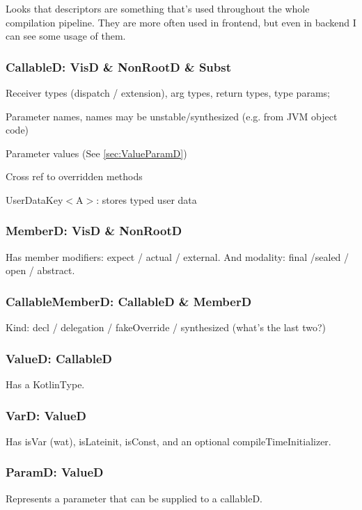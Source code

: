 \documentclass{article}
\begin{document}
Looks that descriptors are something that's used throughout the whole compilation pipeline. They are more often used in frontend, but even in backend I can see some usage of them.

\subsubsection{CallableD: VisD \& NonRootD \& Subst}

Receiver types (dispatch / extension), arg types, return types, type params;

Parameter names, names may be unstable/synthesized (e.g. from JVM object code)

Parameter values (See \ref{sec:ValueParamD})

Cross ref to overridden methods

UserDataKey$<$A$>$: stores typed user data

\subsubsection{MemberD: VisD \& NonRootD}

Has member modifiers: expect / actual / external. And modality: final /sealed / open / abstract.

\subsubsection{CallableMemberD: CallableD \& MemberD}

Kind: decl / delegation / fakeOverride / synthesized (what's the last two?)

\subsubsection{ValueD: CallableD}

Has a KotlinType.

\subsubsection{VarD: ValueD}

Has isVar (wat), isLateinit, isConst, and an optional compileTimeInitializer.

\subsubsection{ParamD: ValueD}
Represents a parameter that can be supplied to a callableD.
\end{document}
